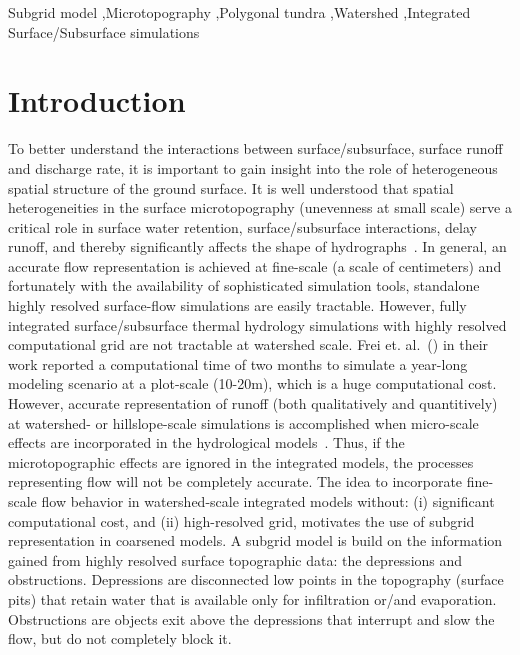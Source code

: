 \documentclass[review,11pt]{elsarticle}
\begin{document}
\begin{frontmatter}
\begin{keyword}
Subgrid model \sep Microtopography  \sep  Polygonal tundra \sep  Watershed \sep Integrated Surface/Subsurface simulations
\end{keyword}


\end{frontmatter}

\linenumbers

\FloatBarrier
\section{Introduction}\label{introduction}
To better understand the interactions between surface/subsurface, surface runoff and discharge rate, it is important to gain insight into the role of
heterogeneous spatial structure of the ground surface.
It is well understood that spatial heterogeneities in the surface microtopography (unevenness at small scale) serve a critical role in surface water retention, surface/subsurface interactions, delay runoff, and thereby significantly affects the shape of hydrographs~\cite{toth1962theory,dunne1991effects,holden2005peatland, kvaerner2008generation, huang2009influences, andresen2015disappearing}. In general, an accurate flow representation is achieved at fine-scale (a scale of centimeters) and fortunately with the availability of sophisticated simulation tools, standalone highly resolved surface-flow simulations are easily tractable. However, fully integrated surface/subsurface thermal hydrology simulations with highly resolved computational grid are not tractable at watershed scale. Frei et. al.~(\citeyear{frei2010effects}) in their work reported a computational time of two months to simulate a year-long modeling scenario at a plot-scale (10-20m), which is a huge computational cost. However, accurate representation of runoff (both qualitatively and quantitively) at watershed- or hillslope-scale simulations is accomplished when micro-scale effects are incorporated in the hydrological models~\cite{bronstert1997modelling,nakayama2006simulation}. Thus, if the microtopographic effects are ignored in the integrated models, the processes representing flow will not be completely accurate. 
The idea to incorporate fine-scale flow behavior in watershed-scale integrated models without: (i) significant computational cost, and (ii) high-resolved grid, motivates the use of subgrid representation in coarsened models. A subgrid model is build on the information gained from highly resolved surface topographic data: the depressions and obstructions. Depressions are disconnected low points in the topography (surface pits) that retain water that is available only for infiltration or/and evaporation. Obstructions are objects exit above the depressions that interrupt and slow the flow, but do not completely block it. 
\end{document}
